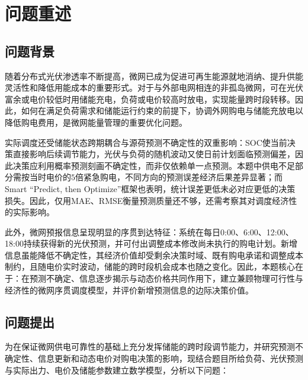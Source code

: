 \section{问题重述}
\subsection{问题背景}

随着分布式光伏渗透率不断提高，微网已成为促进可再生能源就地消纳、提升供能灵活性和降低用能成本的重要形式\cite{hatziargyriou2007}。对于与外部电网相连的非孤岛微网，可在光伏富余或电价较低时用储能充电，负荷或电价较高时放电，实现能量跨时段转移\cite{lujano2017}。因此，如何在满足负荷需求和储能运行约束的前提下，协调外网购电与储能充放电以降低购电费用，是微网能量管理的重要优化问题。

实际调度还受储能状态跨期耦合与源荷预测不确定性的双重影响：SOC使当前决策直接影响后续调节能力，光伏与负荷的随机波动又使日前计划面临预测偏差，因此决策应利用概率预测刻画不确定性，而非仅依赖单一点预测\cite{hong2016}。本题中供电不足部分需按当时电价的$5$倍紧急购电，不同方向的预测误差经济后果差异显著；而Smart ``Predict, then Optimize''框架也表明，统计误差更低未必对应更低的决策损失\cite{elmachtoub2022}。因此，仅用MAE、RMSE衡量预测质量还不够，还需考察其对调度经济性的实际影响。

此外，微网预报信息呈现明显的序贯到达特征：系统在每日0:00、6:00、12:00、18:00持续获得新的光伏预测，并可付出调整成本修改尚未执行的购电计划。新增信息虽能降低不确定性，其经济价值却受剩余决策时域、既有购电承诺和调整成本制约，且随电价实时波动，储能的跨时段机会成本也随之变化。因此，本题核心在于：在预测不确定、信息逐步揭示与动态价格共同作用下，建立兼顾物理可行性与经济性的微网序贯调度模型，并评价新增预测信息的边际决策价值。

\subsection{问题提出}

为在保证微网供电可靠性的基础上充分发挥储能的跨时段调节能力，并研究预测不确定性、信息更新和动态电价对购电决策的影响，现结合题目所给负荷、光伏预测与实际出力、电价及储能参数建立数学模型，分析以下问题：

